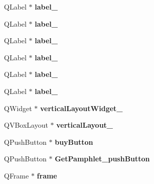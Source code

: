 \begin{DoxyCompactItemize}
Q\+Label $\ast$ {\bfseries label\+\_}
\item 
\mbox{\label{class_ui___main_interface_a0b3c936c383f71936b959b63b782f390}} 
Q\+Label $\ast$ {\bfseries label\+\_}
\item 
\mbox{\label{class_ui___main_interface_a644cd83903fb42254a4d994475da529b}} 
Q\+Label $\ast$ {\bfseries label\+\_}
\item 
\mbox{\label{class_ui___main_interface_a140f4a085ea441d6f3d7885732af9f74}} 
Q\+Label $\ast$ {\bfseries label\+\_}
\item 
\mbox{\label{class_ui___main_interface_a0c7ccfcd4614f6bbc4be524530472bb4}} 
Q\+Label $\ast$ {\bfseries label\+\_}
\item 
\mbox{\label{class_ui___main_interface_a4146e207803757b7afc5e51dfd32a4ee}} 
Q\+Label $\ast$ {\bfseries label\+\_}
\item 
\mbox{\label{class_ui___main_interface_aa1128c50ca2ab556b48f7ff07e6cc482}} 
Q\+Widget $\ast$ {\bfseries vertical\+Layout\+Widget\+\_}
\item 
\mbox{\label{class_ui___main_interface_a7dc3fbcf21868c8cb85d7069cf5e811a}} 
Q\+V\+Box\+Layout $\ast$ {\bfseries vertical\+Layout\+\_}
\item 
\mbox{\label{class_ui___main_interface_a0a5f99023ff1024b4f5d05a8f2492a75}} 
Q\+Push\+Button $\ast$ {\bfseries buy\+Button}
\item 
\mbox{\label{class_ui___main_interface_af99b8add3a141568d4599b3811e9fd5f}} 
Q\+Push\+Button $\ast$ {\bfseries Get\+Pamphlet\+\_\+push\+Button}
\item 
\mbox{\label{class_ui___main_interface_a8e5bf05ef05716b5a3c45a1925db8563}} 
Q\+Frame $\ast$ {\bfseries frame}
\item 
\mbox{\label{class_ui___main_interface_a9c38de536b87eb079409f565158ca1d1}} 

\end{DoxyCompactItemize}
